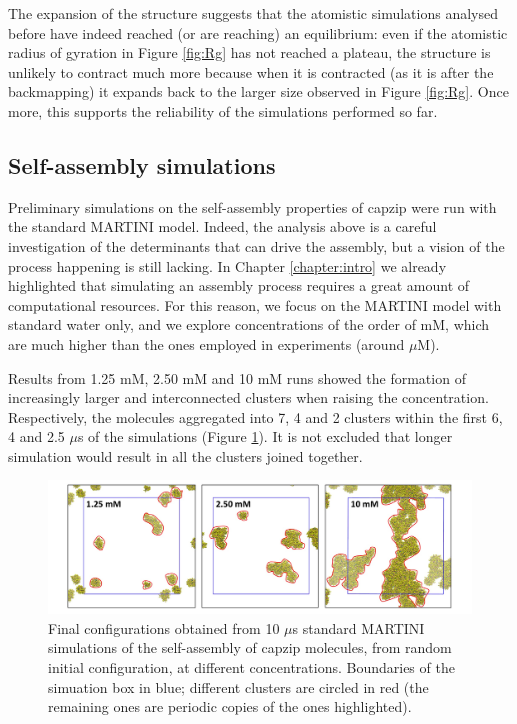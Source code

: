 The expansion of the structure suggests that the atomistic simulations analysed before have indeed reached (or are reaching) an equilibrium: even if the atomistic radius of gyration in Figure \ref{fig:Rg} has not reached a plateau, the structure is unlikely to contract much more because when it is contracted (as it is after the backmapping) it expands back to the larger size observed in Figure \ref{fig:Rg}.
Once more, this supports the reliability of the simulations performed so far.

\subsection{Self-assembly simulations}
Preliminary simulations on the self-assembly properties of capzip were run with the standard MARTINI model. Indeed, the analysis above is a careful investigation of the determinants that can drive the assembly, but a vision of the process happening is still lacking.
%
In Chapter \ref{chapter:intro} we already highlighted that simulating an assembly process requires a great amount of computational resources. For this reason, we focus on the MARTINI model with standard water only, and we explore concentrations of the order of mM, which are much higher than the ones employed in experiments (around $\mu$M).

Results from 1.25 mM, 2.50 mM and 10 mM runs showed the formation of increasingly larger and interconnected clusters when raising the concentration. Respectively, the molecules aggregated into 7, 4 and 2 clusters within the first 6, 4 and 2.5 $\mu$s of the simulations (Figure \ref{fig:SA_final}). It is not excluded that longer simulation would result in all the clusters joined together.
%
\begin{figure}[t!]
\centering\includegraphics[width=0.95\linewidth]{3results_capsule/pics/final_SA.png} 
\caption[Self-assembly simulations, final configurations]{Final configurations obtained from 10 $\mu$s standard MARTINI simulations of the self-assembly of capzip molecules, from random initial configuration, at different concentrations. Boundaries of the simuation box in blue; different clusters are circled in red (the remaining ones are periodic copies of the ones highlighted).}
\label{fig:SA_final}
\end{figure}

